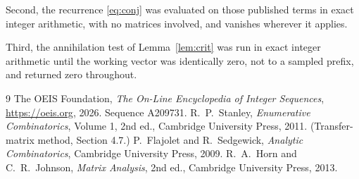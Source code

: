 \documentclass[11pt,a4paper]{article}
\theoremstyle{plain}
\theoremstyle{definition}
\begin{document}
Second, the recurrence \eqref{eq:conj} was evaluated on those published terms in exact
integer arithmetic, with no matrices involved, and vanishes wherever it applies.

Third, the annihilation test of Lemma~\ref{lem:crit} was run in exact integer arithmetic
until the working vector was identically zero, not to a sampled prefix, and returned zero
throughout.

\begin{thebibliography}{9}
 The OEIS Foundation, \emph{The On-Line Encyclopedia of Integer
Sequences}, \url{https://oeis.org}, 2026. Sequence A209731.
 R.~P.~Stanley, \emph{Enumerative Combinatorics}, Volume 1, 2nd ed.,
Cambridge University Press, 2011. (Transfer-matrix method, Section 4.7.)
 P.~Flajolet and R.~Sedgewick, \emph{Analytic Combinatorics}, Cambridge
University Press, 2009.
 R.~A.~Horn and C.~R.~Johnson, \emph{Matrix Analysis}, 2nd ed., Cambridge
University Press, 2013.
\end{thebibliography}
\end{document}
